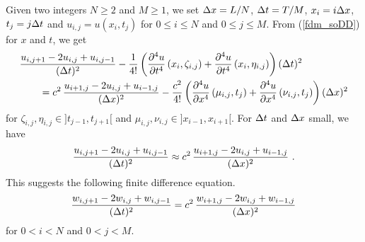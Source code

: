 Given two integers $N\geq 2$ and $M\geq 1$, we set $\Delta{x} = L/N$,
$\Delta{t} = T/M$, $x_i = i \Delta{x}$, $t_j = j \Delta{t}$ and
$\displaystyle u_{i,j} = u\left(x_i,t_j\right)$
for $0\leq i \leq N$ and $0\leq j \leq M$.
From (\ref{fdm_soDD}) for $x$ and $t$, we get
\begin{equation} \label{fdm_sch3_tr}
\begin{split} 
&\frac{u_{i,j+1} - 2u_{i,j} + u_{i,j-1}}{(\Delta{t})^2}
- \frac{1}{4!} \left( \frac{\partial^{4}{u}}{\partial{t}^{4}}\left(x_i,\zeta_{i,j} \right)
+ \frac{\partial^{4}{u}}{\partial{t}^{4}}\left(x_i,\eta_{i,j} \right) \right) (\Delta{t})^2 \\
&\qquad = c^2 \, \frac{u_{i+1,j} - 2u_{i,j} + u_{i-1,j}}{(\Delta{x})^2}
- \frac{c^2}{4!} \left( \frac{\partial^{4}{u}}{\partial{x}^{4}}\left(\mu_{i,j},t_j\right)
+ \frac{\partial^{4}{u}}{\partial{x}^{4}}\left(\nu_{i,j},t_j\right) \right) (\Delta{x})^2
\end{split}
\end{equation}
for $\zeta_{i,j}, \eta_{i,j} \in ]t_{j-1},t_{j+1}[$ and
$\mu_{i,j}, \nu_{i,j} \in ]x_{i-1},x_{i+1}[$.
For $\Delta{t}$ and $\Delta{x}$ small, we have
\[
\frac{u_{i,j+1} - 2u_{i,j} + u_{i,j-1}}{(\Delta{t})^2} \approx c^2 \,
\frac{u_{i+1,j} - 2u_{i,j} + u_{i-1,j}}{(\Delta{x})^2} \ .
\]
This suggests the following finite difference equation.
\begin{equation} \label{fdm_sch3}
\frac{w_{i,j+1} - 2w_{i,j} + w_{i,j-1}}{(\Delta{t})^2} = c^2 \,
\frac{w_{i+1,j} - 2w_{i,j} + w_{i-1,j}}{(\Delta{x})^2}
\end{equation}
for $0 < i <N$ and $0 < j < M$.

